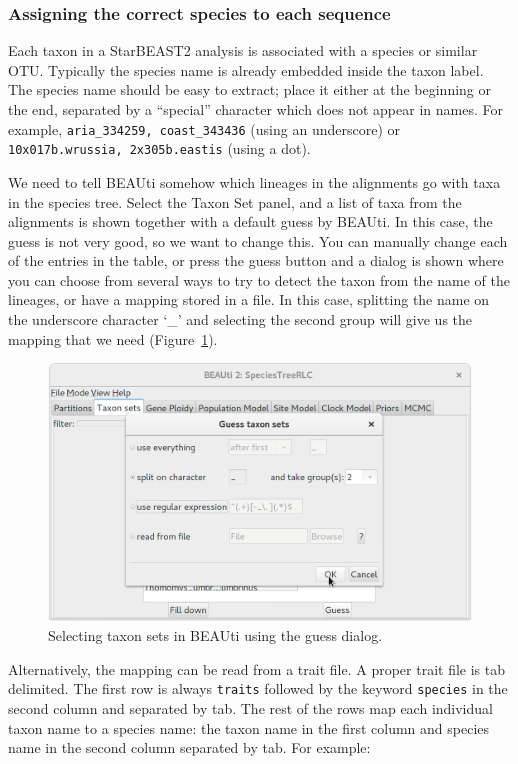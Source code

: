 \documentclass{article}
\begin{document}
\subsubsection*{Assigning the correct species to each sequence}

Each taxon in a StarBEAST2 analysis is associated with a species or similar OTU.
Typically the species name is already embedded inside the taxon label. The
species name should be easy to extract; place it either at the beginning or the
end, separated by a ``special'' character which does not appear in names. For
example, \texttt{aria\_334259, coast\_343436} (using an underscore) or
\texttt{10x017b.wrussia, 2x305b.eastis} (using a dot).

We need to tell BEAUti somehow which lineages in the alignments go with taxa in
the species tree. Select the Taxon Set panel, and a list of taxa from the
alignments is shown together with a default guess by BEAUti. In this case, the
guess is not very good, so we want to change this. You can manually change each
of the entries in the table, or press the guess button and a dialog is shown
where you can choose from several ways to try to detect the taxon from the name
of the lineages, or have a mapping stored in a file. In this case, splitting the
name on the underscore character `\_' and selecting the second group will give
us the mapping that we need (Figure~\ref{fig:taxonSets}).

\begin{figure}[htb!]
\centering
\includegraphics[width=\textwidth]{figures/beauti-guess.png}
\caption{Selecting taxon sets in BEAUti using the guess dialog.}
\label{fig:taxonSets}
\end{figure}

Alternatively, the mapping can be read from a trait file. A proper trait file is
tab delimited. The first row is always \texttt{traits} followed by the keyword
\texttt{species} in the second column and separated by tab. The rest of the rows
map each individual taxon name to a species name: the taxon name in the first
column and species name in the second column separated by tab. For example:
\end{document}
